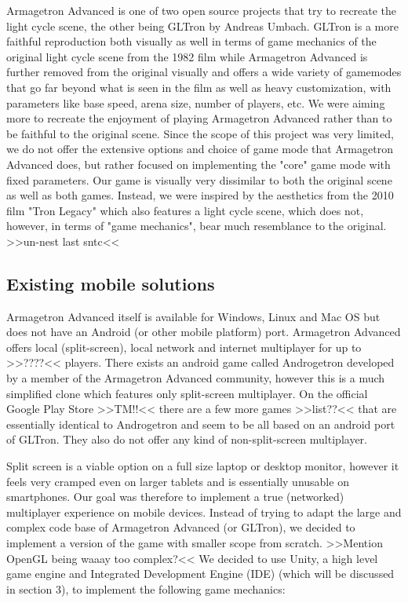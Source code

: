\documentclass{report}
\begin{document}
Armagetron Advanced is one of two open source projects that try to recreate the light cycle scene, the other being GLTron by Andreas Umbach.
GLTron is a more faithful reproduction both visually as well in terms of game mechanics of the original light cycle scene from the 1982 film while Armagetron Advanced is further removed from the original visually and offers a wide variety of gamemodes that go far beyond what is seen in the film as well as heavy customization, with parameters like base speed, arena size, number of players, etc.
We were aiming more to recreate the enjoyment of playing Armagetron Advanced rather than to be faithful to the original scene.
Since the scope of this project was very limited, we do not offer the extensive options and choice of game mode that Armagetron Advanced does, 
but rather focused on implementing the "core" game mode with fixed parameters. 
Our game is visually very dissimilar to both the original scene as well as both games. Instead, we were inspired by the aesthetics from the 2010 film "Tron Legacy" which also features a light cycle scene, which does not, however, in terms of "game mechanics", bear much resemblance to the original. >>un-nest last sntc<<

\subsection{Existing mobile solutions}
Armagetron Advanced itself is available for Windows, Linux and Mac OS but does not have an Android (or other mobile platform) port.
Armagetron Advanced offers local (split-screen), local network and internet multiplayer for up to >>????<< players. 
 There exists an android game called Androgetron developed by a member of the Armagetron Advanced community, however this is a much simplified clone  which features only split-screen multiplayer. On the official Google Play Store >>TM!!<< there are a few more games >>list??<< that are essentially identical to Androgetron and seem to be all based on an android port of GLTron. They also do not offer any kind of non-split-screen multiplayer.

Split screen is a viable option on a full size laptop or desktop monitor, however it feels very cramped even on larger tablets and is essentially unusable on smartphones.
Our goal was therefore to implement a true (networked) multiplayer experience on mobile devices.
Instead of trying to adapt the large and complex code base of Armagetron Advanced (or GLTron), we decided to implement a version of the game with smaller scope from scratch.
>>Mention OpenGL being waaay too complex?<<
We decided to use Unity, a high level game engine and Integrated Development Engine (IDE) (which will be discussed in section 3), to implement the following game mechanics:
\end{document}
